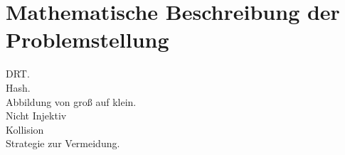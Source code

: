 \documentclass[
10pt, %
a4paper, %
oneside, %
headinclude,footinclude, %
BCOR5mm, %
]{scrartcl}
\title{\normalfont\spacedallcaps{Projektaufgabe AE}} %
\subtitle{Spotify playlist cleaner} %
\author{\spacedlowsmallcaps{Raphael Drechsler}} %
\date{} %
\begin{document}

\renewcommand{\sectionmark}[1]{\markright{\spacedlowsmallcaps{#1}}} %
\lehead{\mbox{\llap{\small\thepage\kern1em\color{halfgray} \vline}\color{halfgray}\hspace{0.5em}\rightmark\hfil}} %

\pagestyle{scrheadings} %


\maketitle %

\setcounter{tocdepth}{2} %

\tableofcontents %







\newpage %

\section{Mathematische Beschreibung der Problemstellung}

DRT.\\
Hash.\\
Abbildung von groß auf klein.\\
Nicht Injektiv\\
Kollision\\
Strategie zur Vermeidung.\\
\end{document}
